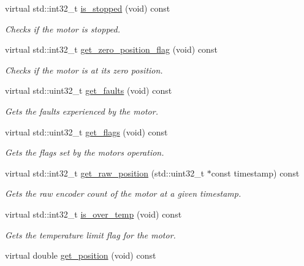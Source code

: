 \begin{DoxyCompactItemize}
virtual std\+::int32\+\_\+t \mbox{\hyperlink{classpros_1_1Motor_a884c19ae71a6c9f0b316520f09769be9}{is\+\_\+stopped}} (void) const
\begin{DoxyCompactList}\small\item\em Checks if the motor is stopped. \end{DoxyCompactList}\item 
virtual std\+::int32\+\_\+t \mbox{\hyperlink{classpros_1_1Motor_a589a3cbb397ba065c30c1f16bb3f08a7}{get\+\_\+zero\+\_\+position\+\_\+flag}} (void) const
\begin{DoxyCompactList}\small\item\em Checks if the motor is at its zero position. \end{DoxyCompactList}\item 
virtual std\+::uint32\+\_\+t \mbox{\hyperlink{classpros_1_1Motor_a66c6f6420485059af301a9c8a99b2045}{get\+\_\+faults}} (void) const
\begin{DoxyCompactList}\small\item\em Gets the faults experienced by the motor. \end{DoxyCompactList}\item 
virtual std\+::uint32\+\_\+t \mbox{\hyperlink{classpros_1_1Motor_a7e24aa1c4363a131829e902f12e7364c}{get\+\_\+flags}} (void) const
\begin{DoxyCompactList}\small\item\em Gets the flags set by the motor\textquotesingle{}s operation. \end{DoxyCompactList}\item 
virtual std\+::int32\+\_\+t \mbox{\hyperlink{classpros_1_1Motor_ae82c57d590e18d7d90afec1e9cc3bb4e}{get\+\_\+raw\+\_\+position}} (std\+::uint32\+\_\+t $\ast$const timestamp) const
\begin{DoxyCompactList}\small\item\em Gets the raw encoder count of the motor at a given timestamp. \end{DoxyCompactList}\item 
virtual std\+::int32\+\_\+t \mbox{\hyperlink{classpros_1_1Motor_a099d50ed35d73fa29a46b2beb151ce2b}{is\+\_\+over\+\_\+temp}} (void) const
\begin{DoxyCompactList}\small\item\em Gets the temperature limit flag for the motor. \end{DoxyCompactList}\item 
virtual double \mbox{\hyperlink{classpros_1_1Motor_a70e725a94ec42dc7cbb3e460c36dcad3}{get\+\_\+position}} (void) const

\end{DoxyCompactItemize}
